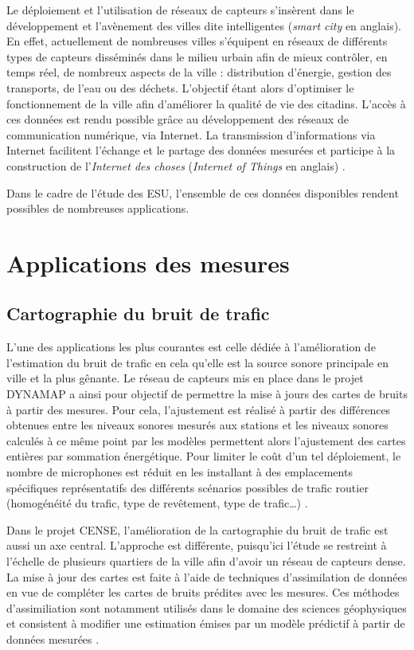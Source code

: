 Le déploiement et l'utilisation de réseaux de capteurs s'insèrent dans le développement et l'avènement des villes dite intelligentes (\textit{smart city} en anglais). En effet, actuellement de nombreuses villes s'équipent en réseaux de différents types de capteurs disséminés dans le milieu urbain afin de mieux contrôler, en temps réel, de nombreux aspects de la ville : distribution d'énergie, gestion des transports, de l’eau ou des déchets. L'objectif étant alors d'optimiser le fonctionnement de la ville afin d'améliorer la qualité de vie des citadins. L'accès à ces données est rendu possible grâce au développement des réseaux de communication numérique, via Internet. La transmission d'informations via Internet facilitent l'échange et le partage des données mesurées et participe à la construction de l'\textit{Internet des choses} (\textit{Internet of Things} en anglais) \cite{zanella2014internet}. 

Dans le cadre de l'étude des ESU, l'ensemble de ces données disponibles rendent possibles de nombreuses applications. 

\section{Applications des mesures}

\subsection{Cartographie du bruit de trafic}

L'une des applications les plus courantes est celle dédiée à l'amélioration de l'estimation du bruit de trafic en cela qu'elle est la source sonore principale en ville et la plus gênante. Le réseau de capteurs mis en place dans le projet DYNAMAP a ainsi pour objectif de permettre la mise à jours des cartes de bruits à partir des mesures. 
Pour cela, l'ajustement est réalisé à partir des différences obtenues entre les niveaux sonores mesurés aux stations et les niveaux sonores calculés à ce même point par les modèles permettent alors l'ajustement des cartes entières par sommation énergétique. Pour limiter le coût d'un tel déploiement, le nombre de microphones est réduit en les installant à des emplacements spécifiques représentatifs des différents scénarios possibles de trafic routier (homogénéité du trafic, type de revêtement, type de trafic\dots) \cite{zambon2017life}.

Dans le projet CENSE, l'amélioration de la cartographie du bruit de trafic est aussi un axe central. L'approche est différente, puisqu'ici l'étude se restreint à l'échelle de plusieurs quartiers de la ville afin d'avoir un réseau de capteurs dense. La mise à jour des cartes est faite à l'aide de techniques d'assimilation de données en vue de compléter les cartes de bruits prédites avec les mesures. 
Ces méthodes d'assimiliation sont notamment utilisés dans le domaine des sciences géophysiques et consistent à modifier une estimation émises par un modèle prédictif à partir de données mesurées \cite{wu2008comparison}. 

